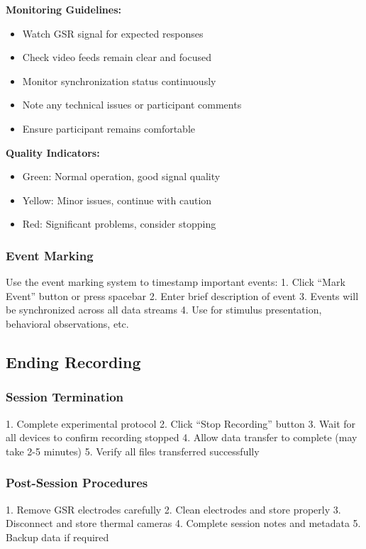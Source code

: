 \textbf{Monitoring Guidelines:}
\begin{itemize}
\item Watch GSR signal for expected responses
\item Check video feeds remain clear and focused
\item Monitor synchronization status continuously
\item Note any technical issues or participant comments
\item Ensure participant remains comfortable
\end{itemize}

\textbf{Quality Indicators:}
\begin{itemize}
\item Green: Normal operation, good signal quality
\item Yellow: Minor issues, continue with caution
\item Red: Significant problems, consider stopping
\end{itemize}

\subsubsection{Event Marking}

Use the event marking system to timestamp important events:
1. Click ``Mark Event'' button or press spacebar
2. Enter brief description of event
3. Events will be synchronized across all data streams
4. Use for stimulus presentation, behavioral observations, etc.

\subsection{Ending Recording}

\subsubsection{Session Termination}

1. Complete experimental protocol
2. Click ``Stop Recording'' button
3. Wait for all devices to confirm recording stopped
4. Allow data transfer to complete (may take 2-5 minutes)
5. Verify all files transferred successfully

\subsubsection{Post-Session Procedures}

1. Remove GSR electrodes carefully
2. Clean electrodes and store properly
3. Disconnect and store thermal cameras
4. Complete session notes and metadata
5. Backup data if required

